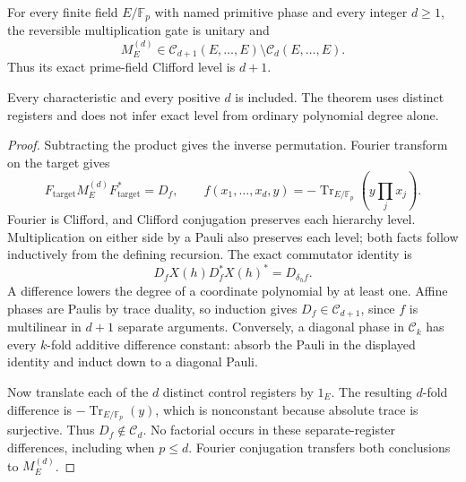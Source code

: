 \begin{theorem}
{\normalfont\statusProved}\quad
For every finite field $E/\mathbb F_p$ with named primitive phase and
every integer $d\geq1$, the reversible multiplication gate is unitary and
\[
 M_E^{(d)}\in\mathcal C_{d+1}(E,\ldots,E)
                   \setminus\mathcal C_d(E,\ldots,E).
\]
Thus its exact prime-field Clifford level is $d+1$.
\end{theorem}
\begin{scope}
Every characteristic and every positive $d$ is included.  The theorem
uses distinct registers and does not infer exact level from ordinary
polynomial degree alone.
\end{scope}
\begin{proof}
Subtracting the product gives the inverse permutation.  Fourier transform
on the target gives
\[
 F_{\mathrm{target}}M_E^{(d)}F_{\mathrm{target}}^*=D_f,
 \qquad f(x_1,\ldots,x_d,y)
       =-\operatorname{Tr}_{E/\mathbb F_p}\left(y\prod_jx_j\right).
\]
Fourier is Clifford, and Clifford conjugation preserves each hierarchy
level.  Multiplication on either side by a Pauli also preserves each
level; both facts follow inductively from the defining recursion.
The exact commutator identity is
\[
 D_fX(h)D_f^*X(h)^*=D_{\delta_hf}.
\]
A difference lowers the degree of a coordinate polynomial by at least
one.  Affine phases are Paulis by trace duality, so induction gives
$D_f\in\mathcal C_{d+1}$, since $f$ is multilinear in $d+1$ separate
arguments.  Conversely, a diagonal phase in $\mathcal C_k$ has every
$k$-fold additive difference constant: absorb the Pauli in the displayed
identity and induct down to a diagonal Pauli.

Now translate each of the $d$ distinct control registers by $1_E$.
The resulting $d$-fold difference is
$-\operatorname{Tr}_{E/\mathbb F_p}(y)$, which is nonconstant because
absolute trace is surjective.  Thus $D_f\notin\mathcal C_d$.
No factorial occurs in these separate-register differences, including
when $p\leq d$.  Fourier conjugation transfers both conclusions to
$M_E^{(d)}$.
\end{proof}

